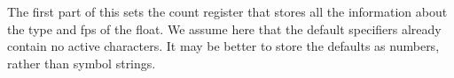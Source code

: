   \begin{macro}{\@xfloat}
     The first part of this sets the count register that stores all
     the information about the type and fps of the float.
%
    We assume here that the default specifiers already contain no
    active characters.
%
    It may be better to store the defaults as numbers, rather than
    symbol strings.
%
    \begin{teX}
\def\@xfloat #1[#2]{%
  \@nodocument %
  \def \@captype {#1}%
   \def \@fps {#2}%
   \@onelevel@sanitize \@fps 
   \def \reserved@b {!}%
   \ifx \reserved@b \@fps
     \@fpsadddefault
   \else
     \ifx \@fps \@empty
       \@fpsadddefault
     \fi
   \fi
   \ifhmode
     \@bsphack
     \@floatpenalty -\@Mii
   \else
     \@floatpenalty-\@Miii
   \fi
  \ifinner
     \@parmoderr\@floatpenalty\z@
  \else
    \@next\@currbox\@freelist
      {%
       \@tempcnta \sixt@@n
       \expandafter \@tfor \expandafter \reserved@a
         \expandafter :\expandafter =\@fps 
         \do
          {%
           \if \reserved@a h%
             \ifodd \@tempcnta
             \else
               \advance \@tempcnta \@ne
             \fi
           \fi
           \if \reserved@a t%
             \@setfpsbit \tw@
           \fi
           \if \reserved@a b%
             \@setfpsbit 4%
           \fi
           \if \reserved@a p%
             \@setfpsbit 8%
           \fi
           \if \reserved@a !%
             \ifnum \@tempcnta>15
               \advance\@tempcnta -\sixt@@n\relax
             \fi
           \fi
           }%
       \@tempcntb \csname ftype@\@captype \endcsname
       \multiply \@tempcntb \@xxxii
       \advance \@tempcnta \@tempcntb
       \global \count\@currbox \@tempcnta
       }%
    \@fltovf
  \fi
    \end{teX}


\end{macro}
